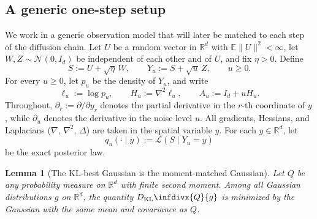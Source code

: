 \documentclass[11pt]{article}
\def\E{\mathbb{E}}
\def\R{\mathbb{R}}
\newcommand{\kl}{D_{\mathrm{KL}}\infdivx}
\newcommand{\norm}[1]{\|#1\|}
\newcommand{\Law}{\mathcal{L}}
\newtheorem{lemma}{Lemma}
\begin{document}
\subsection{A generic one-step setup}

We work in a generic observation model that will later be matched to each step of the diffusion chain. Let \(U\) be a random vector in \(\R^d\) with \(\E\norm{U}^2<\infty\), let \(W,Z\sim\mathcal N(0,I_d)\) be independent of each other and of \(U\), and fix \(\eta>0\). Define
\begin{equation}
\label{eq:generic_setup}
S := U + \sqrt{\eta}\,W,
\qquad
Y_u := S + \sqrt{u}\,Z,
\qquad u\ge 0.
\end{equation}
For every \(u\ge 0\), let \(p_u\) be the density of \(Y_u\), and write
\[
\ell_u := \log p_u,
\qquad
H_u := \nabla^2 \ell_u,
\qquad
A_u := I_d + u H_u.
\]
Throughout, \(\partial_r:=\partial/\partial y_r\) denotes the partial derivative in the \(r\)-th coordinate of $y$, while \(\partial_u\) denotes the derivative in the noise level \(u\). All gradients, Hessians, and Laplacians (\(\nabla\), \(\nabla^2\), \(\Delta\)) are taken in the spatial variable \(y\).
For each \(y\in\R^d\), let
\[
q_u(\cdot\mid y) := \Law(S\mid Y_u=y)
\]
be the exact posterior law.

\begin{lemma}[The KL-best Gaussian is the moment-matched Gaussian]
\label{lem:best_gaussian}
Let \(Q\) be any probability measure on \(\R^d\) with finite second moment. Among all Gaussian distributions \(g\) on \(\R^d\), the quantity \(\kl{Q}{g}\) is minimized by the Gaussian with the same mean and covariance as \(Q\).
\end{lemma}
\end{document}
